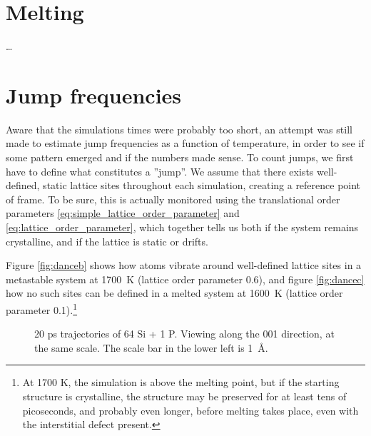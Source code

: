 \documentclass[11pt,bibliography=totoc,index=totoc]{scrbook}   %
\begin{document}
\section{Melting}

\ldots

\section{Jump frequencies}

Aware that the simulations times were probably too short, an attempt was still made to estimate jump frequencies as a function of temperature, in order to see if some pattern emerged and if the numbers made sense.
To count jumps, we first have to define what constitutes a ''jump''. 
We assume that there exists well-defined, static lattice sites throughout each simulation, creating a reference point of frame.
To be sure, this is actually monitored using the translational order parameters \eqref{eq:simple_lattice_order_parameter} and \eqref{eq:lattice_order_parameter}, which together tells us both if the system remains crystalline, and if the lattice is static or drifts. 

Figure \ref{fig:danceb} shows how atoms vibrate around well-defined lattice sites in a metastable system at 1700~K (lattice order parameter 0.6), and figure \ref{fig:dancec} how no such sites can be defined in a melted system at 1600~K (lattice order parameter 0.1).\footnote{At 1700 K, the simulation is above the melting point, but if the starting structure is crystalline, the structure may be preserved for at least tens of picoseconds, and probably even longer, before melting takes place, even with the interstitial defect present.}

  \begin{figure}[htp]
    \begin{center}
    \end{center}
    \caption{20 ps trajectories of 64 Si + 1 P. Viewing along the 001 direction, at the same scale. The scale bar in the lower left is 1~Å.}
    \label{fig:dance}
  \end{figure}
\end{document}
